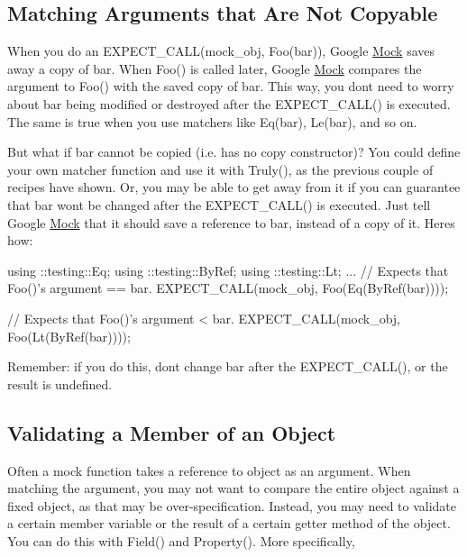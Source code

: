\subsection*{Matching Arguments that Are Not Copyable}

When you do an {\ttfamily E\+X\+P\+E\+C\+T\+\_\+\+C\+A\+L\+L(mock\+\_\+obj, Foo(bar))}, Google \hyperlink{class_mock}{Mock} saves away a copy of {\ttfamily bar}. When {\ttfamily Foo()} is called later, Google \hyperlink{class_mock}{Mock} compares the argument to {\ttfamily Foo()} with the saved copy of {\ttfamily bar}. This way, you don\textquotesingle{}t need to worry about {\ttfamily bar} being modified or destroyed after the {\ttfamily E\+X\+P\+E\+C\+T\+\_\+\+C\+A\+L\+L()} is executed. The same is true when you use matchers like {\ttfamily Eq(bar)}, {\ttfamily Le(bar)}, and so on.

But what if {\ttfamily bar} cannot be copied (i.\+e. has no copy constructor)? You could define your own matcher function and use it with {\ttfamily Truly()}, as the previous couple of recipes have shown. Or, you may be able to get away from it if you can guarantee that {\ttfamily bar} won\textquotesingle{}t be changed after the {\ttfamily E\+X\+P\+E\+C\+T\+\_\+\+C\+A\+L\+L()} is executed. Just tell Google \hyperlink{class_mock}{Mock} that it should save a reference to {\ttfamily bar}, instead of a copy of it. Here\textquotesingle{}s how\+:


\begin{DoxyCode}
using ::testing::Eq;
using ::testing::ByRef;
using ::testing::Lt;
...
  // Expects that Foo()'s argument == bar.
  EXPECT\_CALL(mock\_obj, Foo(Eq(ByRef(bar))));

  // Expects that Foo()'s argument < bar.
  EXPECT\_CALL(mock\_obj, Foo(Lt(ByRef(bar))));
\end{DoxyCode}


Remember\+: if you do this, don\textquotesingle{}t change {\ttfamily bar} after the {\ttfamily E\+X\+P\+E\+C\+T\+\_\+\+C\+A\+L\+L()}, or the result is undefined.

\subsection*{Validating a Member of an Object}

Often a mock function takes a reference to object as an argument. When matching the argument, you may not want to compare the entire object against a fixed object, as that may be over-\/specification. Instead, you may need to validate a certain member variable or the result of a certain getter method of the object. You can do this with {\ttfamily Field()} and {\ttfamily Property()}. More specifically,


